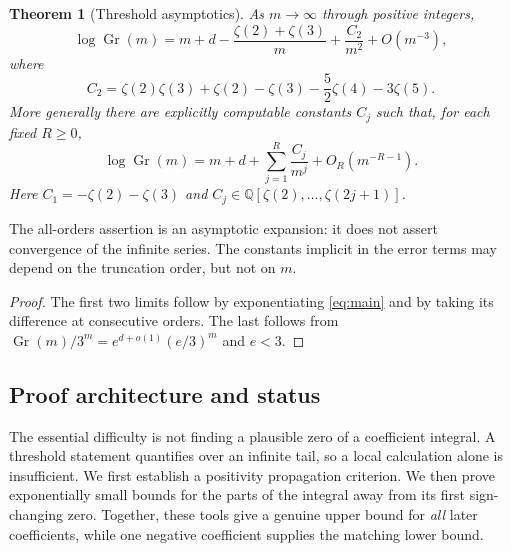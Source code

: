 \documentclass[11pt]{article}
\numberwithin{equation}{section}
\newtheorem{theorem}{Theorem}[section]
\newtheorem{corollary}[theorem]{Corollary}
\theoremstyle{definition}
\newcommand{\Gr}{\operatorname{Gr}}
\newcommand{\Q}{\mathbb Q}
\begin{document}
\begin{theorem}[Threshold asymptotics]\label{thm:main}
As $m\to\infty$ through positive integers,
\begin{equation}\label{eq:main}
 \log\Gr(m)=m+d-\frac{\zeta(2)+\zeta(3)}{m}
                +\frac{C_2}{m^2}+O(m^{-3}),
\end{equation}
where
\begin{equation}\label{eq:C2}
 C_2=\zeta(2)\zeta(3)+\zeta(2)-\zeta(3)
                 -\frac52\zeta(4)-3\zeta(5).
\end{equation}
More generally there are explicitly computable constants $C_j$ such that,
for each fixed $R\ge0$,
\begin{equation}\label{eq:allorders}
 \log\Gr(m)=m+d+\sum_{j=1}^{R}\frac{C_j}{m^j}
                      +O_R(m^{-R-1}).
\end{equation}
Here $C_1=-\zeta(2)-\zeta(3)$ and
$C_j\in\Q[\zeta(2),\ldots,\zeta(2j+1)]$.
\end{theorem}

The all-orders assertion is an asymptotic expansion: it does not assert
convergence of the infinite series. The constants implicit in the error
terms may depend on the truncation order, but not on $m$.

\begin{proof}
The first two limits follow by exponentiating \eqref{eq:main} and by
taking its difference at consecutive orders. The last follows from
$\Gr(m)/3^m=e^{d+o(1)}(e/3)^m$ and $e<3$.
\end{proof}

\subsection{Proof architecture and status}
The essential difficulty is not finding a plausible zero of a coefficient
integral. A threshold statement quantifies over an infinite tail, so a
local calculation alone is insufficient. We first establish a positivity
propagation criterion. We then prove exponentially small bounds for the
parts of the integral away from its first sign-changing zero. Together,
these tools give a genuine upper bound for \emph{all} later coefficients,
while one negative coefficient supplies the matching lower bound.
\end{document}
